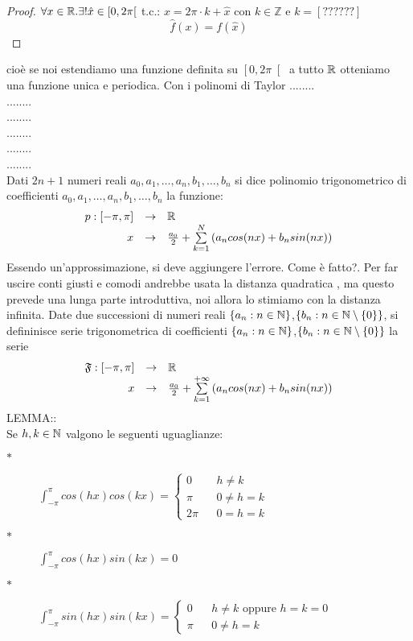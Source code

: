 \begin{proof}
	$\forall x\in \mathbb{R}. \exists ! \hat{x}\in\left[0,2\pi\right[$ t.c.: $x=2\pi\cdot k+\hat{x}$ con $k\in\mathbb{Z}$ e $k=\left[??????\right]$\\
	$$\hat{f}(x)=f(\hat{x})$$
\end{proof}
cioè se noi estendiamo una funzione definita su $\left[0,2\pi\right[$ a tutto $ \mathbb{R}$ otteniamo una funzione unica e periodica.
\observation
Con i polinomi di Taylor ........\\
........\\
........\\
........\\
........\\
........\\
Dati $2n+1$ numeri reali $a_0,a_1,\dotsc,a_n,b_1,\dotsc,b_n$ si dice polinomio trigonometrico di coefficienti $a_0,a_1,\dotsc,a_n,b_1,\dotsc,b_n$ la funzione:
$$\begin{array}{rcl} p: \left[-\pi,\pi\right] & \to &  \mathbb{R} \\ x & \to & \frac{a_0}{2}+\sum\limits_{k=1}^{N}\left(a_ncos(nx)+b_nsin(nx)\right) \end{array}$$
\observation
Essendo un'approssimazione, si deve aggiungere l'errore. Come è fatto?. Per far uscire conti giusti e comodi andrebbe usata la distanza quadratica , ma questo prevede una lunga parte introduttiva, noi allora lo stimiamo con la distanza infinita.
Date due successioni di numeri reali $\left\{a_n:n\in\mathbb{N}\right\}$,$\left\{b_n:n\in\mathbb{N}\setminus\left\{0\right\}\right\}$, si defininisce serie trigonometrica di coefficienti  $\left\{a_n:n\in\mathbb{N}\right\}$,$\left\{b_n:n\in\mathbb{N}\setminus\left\{0\right\}\right\}$ la serie
$$\begin{array}{rcl} \mathfrak{F}: \left[-\pi,\pi\right] & \to &  \mathbb{R} \\ x & \to & \frac{a_0}{2}+\sum\limits_{k=1}^{+\infty}\left(a_ncos(nx)+b_nsin(nx)\right) \end{array}$$
LEMMA::\\
Se $h,k\in\mathbb{N}$ valgono le seguenti uguaglianze:
\begin{description}
	\item[$\ast$]
	$\int_{-\pi}^{\pi} cos(hx)cos(kx)=
	\left\{\begin{matrix}
	0 &&h\ne k\\\pi&&0\ne h=k\\2\pi&&0=h=k
	\end{matrix}\right.$
	\item[$\ast$] $\int_{-\pi}^{\pi}cos(hx)sin(kx)= 0 $
	\item[$\ast$]
	$\int_{-\pi}^{\pi}sin(hx)sin(kx)=
	\left\{\begin{matrix}
	0 &&h\ne k\text{ oppure }h=k=0\\ \pi&&0\ne h=k
	\end{matrix}\right.$
\end{description}
